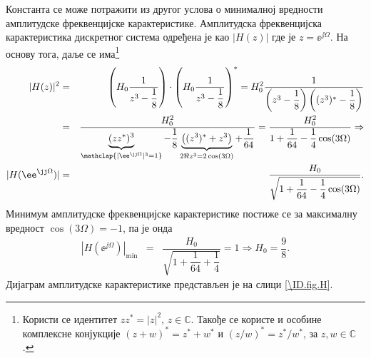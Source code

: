 Константа се може потражити из другог услова о минималној вредности амплитудске фреквенцијске карактеристике.
Амплитудска фреквенцијска карактеристика дискретног система одређена је као $|H(z)|$ где је 
$ z = \ee^{\jj\Omega}$. На основу тога, даље се има\footnote{
    Користи се идентитет $z z^{\ast} = |z|^2$, $z \in \mathbb C$. Такође се користе и особине комплексне конјукције
    $(z + w)^* = z^* + w^*$ и $(z/w)^* = z^*/w^*$, за $z,w\in\mathbb C$.
}
\begin{eqnarray*}
    |H(z)|^2 &=& \left( H_0 \dfrac{1}{z^3 - \dfrac{1}{8}} \right) \cdot  \left( H_0 \dfrac{1}{z^3 - \dfrac{1}{8}} \right)^*
              =  H_0^2 \dfrac{1}{ \left(z^3 - \dfrac{1}{8}\right)\left((z^3)^* - \dfrac{1}{8}\right)  } 
            \\
             &=& \dfrac{H_0^2}{ \underbrace{(zz^*)^3}_{\mathclap{ |\ee^{\jj\Omega}|^3 = 1 }} - \dfrac{1}{8} 
             \underbrace{\left( (z^3)^* + z^3 \right)}_{2\Re{z^3} = 2\cos(3\Omega) } + \dfrac{1}{64} } 
             = 
             \dfrac{H_0^2}{ 1 + \dfrac{1}{64} - \dfrac{1}{4}\cos(3\Omega) } \Rightarrow \\
    |H(\ee^{\jj\Omega})| &=& \dfrac{H_0}{ \sqrt{ 1 + \dfrac{1}{64} - \dfrac{1}{4}\cos(3\Omega)} }.
\end{eqnarray*}
Минимум амплитудске фреквенцијске карактеристике постиже се за максималну вредност $\cos(3\Omega) = -1$, па је онда 
\begin{eqnarray}
    |H(\ee^{\jj\Omega})|_{\min} &=& \dfrac{H_0}{ \sqrt{ 1 + \dfrac{1}{64} + \dfrac{1}{4} } } = 1 
    \Rightarrow H_0 = \dfrac{9}{8}.
\end{eqnarray}
Дијаграм амплитудске карактеристике представљен је на слици \ref{\ID.fig.H}.
